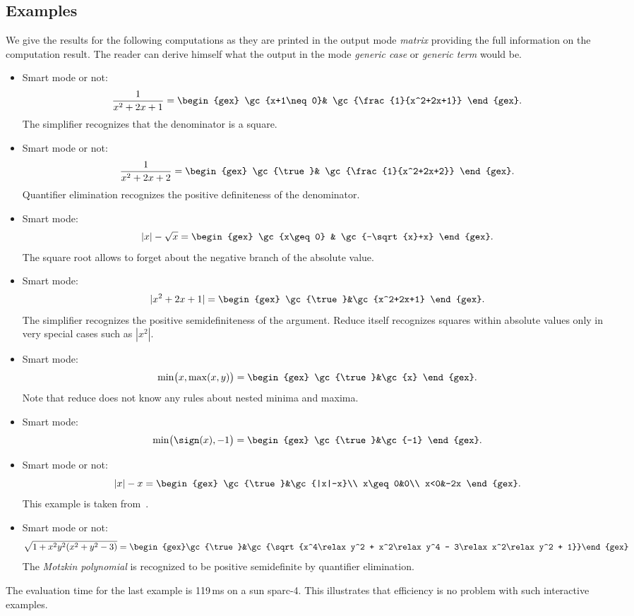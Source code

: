 \subsection{Examples}\label{examples}
We give the results for the following computations as they are printed
in the output mode {\em matrix} providing the full information on the
computation result. The reader can derive himself what the output in
the mode {\em generic case} or {\em generic term} would be.
\begin{itemize}
\item Smart mode or not:
$$
\frac{1}{x^2+2x+1}=\begin{gex}
\gc{x+1\neq0}& \gc{\frac{1}{x^2+2x+1}}
		   \end{gex}.
$$
The simplifier recognizes that the denominator is a square.
\item Smart mode or not:
$$
\frac{1}{x^2+2x+2}=\begin{gex}
\gc{\true}& \gc{\frac{1}{x^2+2x+2}}
		   \end{gex}.
$$
Quantifier elimination recognizes the positive definiteness of the
denominator.
\item Smart mode:
$$
|x|-\sqrt{x}=\begin{gex}
\gc{x\geq 0} & \gc{-\sqrt{x}+x}
	     \end{gex}.
$$
The square root allows to forget about the negative branch of the
absolute value.
\item Smart mode:
$$
|x^2+2x+1|=\begin{gex}
\gc{\true}&\gc{x^2+2x+1}
	   \end{gex}.
$$
The simplifier recognizes the positive semidefiniteness of
the argument. {\sc Reduce} itself recognizes squares within absolute values
only in very special cases such as $|x^2|$.
\item Smart mode:
$$
\min\bigl(x,\max(x,y)\bigr)=\begin{gex}
\gc{\true}&\gc{x}
		  \end{gex}.
$$
Note that {\sc reduce} does not know any rules about nested minima and
maxima.
\item
Smart mode:
$$
\min\bigl(\sign(x),-1\bigr)=\begin{gex}
\gc{\true}&\gc{-1}
		  \end{gex}.
$$
\item Smart mode or not:
$$
|x|-x=\begin{gex}
\gc{\true}&\gc{|x|-x}\\
x\geq0&0\\
x<0&-2x
      \end{gex}.
$$
This example is taken from~\cite{DavenportFaure:94}.
\item
Smart mode or not:
$$
\sqrt{1+x^2\relax y^2\relax
(x^2+y^2-3)}={}
\begin{gex}\gc{\true}&\gc{\sqrt{x^4\relax y^2 +
x^2\relax y^4 - 3\relax x^2\relax y^2 + 1}}\end{gex}
$$
The {\em Motzkin polynomial} is recognized to be positive semidefinite
by quantifier elimination.
\end{itemize}
The evaluation time for the last example is 119\,ms on a {\sc sun
sparc-4}. This illustrates that efficiency is no problem with such
interactive examples.
